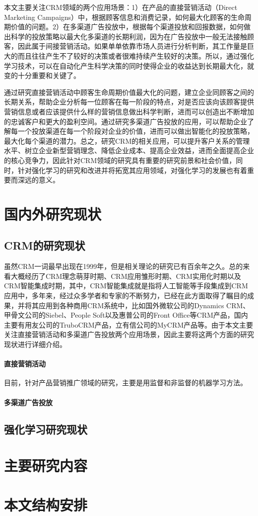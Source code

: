 本文主要关注CRM领域的两个应用场景：1）在产品的直接营销活动（Direct Marketing Campaigns）中，根据顾客信息和消费记录，如何最大化顾客的生命周期价值的问题。2）在多渠道广告投放中，根据每个渠道投放和回报数据，如何做出科学的投放策略以最大化多渠道的长期利润，因为在广告投放中一般无法接触顾客，因此属于间接营销活动。如果单单依靠市场人员进行分析判断，其工作量是巨大的而且往往产生不了较好的决策或者很难持续产生较好的决策。所以，通过强化学习技术，可以在自动化产生科学决策的同时使得企业的收益达到长期最大化，就变的十分重要和关键了。

通过研究直接营销活动中顾客生命周期价值最大化的问题，建立企业同顾客之间的长期关系，帮助企业分析每一位顾客在每一阶段的特点，对是否应该向该顾客提供营销信息或者应该提供什么样的营销信息做出科学判断，进而可以创造出不断增加的忠诚客户和更大的盈利空间。通过研究多渠道广告投放的应用，可以帮助企业了解每一个投放渠道在每一个阶段对企业的价值，进而可以做出智能化的投放策略，最大化每个渠道的潜力。总之，研究CRM的相关应用，可以提升客户关系的管理水平、树立企业新型营销理念、降低企业成本、提高企业效益，进而全面提高企业的核心竞争力，因此针对CRM领域的研究具有重要的研究前景和社会价值，同时，针对强化学习的研究和改进并将拓宽其应用领域，对强化学习的发展也有着重要而深远的意义。

\section{国内外研究现状}

\subsection{CRM的研究现状}
虽然CRM一词最早出现在1999年，但是相关理论的研究已有百余年之久。总的来看大概经历了CRM理念萌芽时期、CRM应用雏形时期、CRM实用化时期以及CRM智能集成时期\citep{王广宇2013客户关系管理}，其中，CRM智能集成就是指将人工智能等手段集成到CRM应用中，多年来，经过众多学者和专家的不断努力，已经在此方面取得了瞩目的成果，并将其应用到各种商用CRM系统中，比如国外微软公司的Dynamics CRM、甲骨文公司的Siebel、People Soft以及惠普公司的Front Office等CRM产品，国内主要有用友公司的TruboCRM产品，立有信公司的MyCRM产品等。由于本文主要关注直接营销活动和多渠道广告投放两个应用场景，因此主要将这两个方面的研究现状进行详细介绍。
\paragraph{直接营销活动}
目前，针对产品营销推广领域的研究，主要是用监督和非监督的机器学习方法。

\paragraph{多渠道广告投放}


\subsection{强化学习研究现状}

\section{主要研究内容}

\section{本文结构安排}